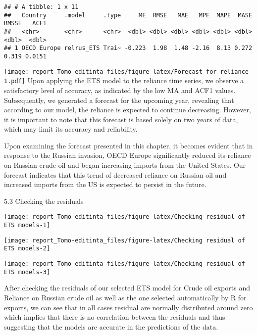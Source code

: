 \documentclass[
]{article}
\begin{document}
\begin{verbatim}
## # A tibble: 1 x 11
##   Country     .model     .type     ME  RMSE   MAE   MPE  MAPE  MASE RMSSE   ACF1
##   <chr>       <chr>      <chr>  <dbl> <dbl> <dbl> <dbl> <dbl> <dbl> <dbl>  <dbl>
## 1 OECD Europe relrus_ETS Trai~ -0.223  1.98  1.48 -2.16  8.13 0.272 0.319 0.0151
\end{verbatim}

\texttt{[image: report\_Tomo-editinta\_files/figure-latex/Forecast for reliance-1.pdf]}
Upon applying the ETS model to the reliance time series, we observe a
satisfactory level of accuracy, as indicated by the low MA and ACF1
values. Subsequently, we generated a forecast for the upcoming year,
revealing that according to our model, the reliance is expected to
continue decreasing. However, it is important to note that this forecast
is based solely on two years of data, which may limit its accuracy and
reliability.

Upon examining the forecast presented in this chapter, it becomes
evident that in response to the Russian invasion, OECD Europe
significantly reduced its reliance on Russian crude oil and began
increasing imports from the United States. Our forecast indicates that
this trend of decreased reliance on Russian oil and increased imports
from the US is expected to persist in the future.

5.3 Checking the residuals

\begin{center}\texttt{[image: report\_Tomo-editinta\_files/figure-latex/Checking residual of ETS models-1]} \end{center}

\begin{center}\texttt{[image: report\_Tomo-editinta\_files/figure-latex/Checking residual of ETS models-2]} \end{center}

\begin{center}\texttt{[image: report\_Tomo-editinta\_files/figure-latex/Checking residual of ETS models-3]} \end{center}

After checking the residuals of our selected ETS model for Crude oil
exports and Reliance on Russian crude oil as well as the one selected
automatically by R for exports, we can see that in all cases residual
are normally distributed around zero which implies that there is no
correlation between the residuals and thus suggesting that the models
are accurate in the predictions of the data.
\end{document}
